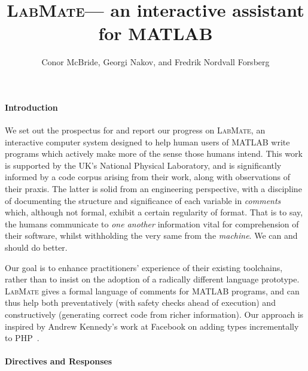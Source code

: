 \documentclass{ws-procs9x6}
\newcommand{\lr}{\textsc{LabMate}}
\newcommand{\ma}{\textsc{MATLAB}}
\newcommand{\remph}{\emph}
\begin{document}
\title{\lr --- an interactive assistant for \ma}
\author{Conor McBride, Georgi Nakov, and Fredrik Nordvall Forsberg}
\address{University of Strathclyde}

\bodymatter

\paragraph{Introduction}

We set out the prospectus for and report our progress on \lr, an interactive computer system designed to help human users of \ma{} write programs which actively make more of the sense those humans intend. This work is supported by the UK's National Physical Laboratory, and is significantly informed by a code corpus arising from their work, along with observations of their praxis. The latter is solid from an engineering perspective, with a discipline of documenting the structure and significance of each variable in \remph{comments} which, although not formal, exhibit a certain regularity of format. That is to say, the humans communicate to \remph{one another} information vital for comprehension of their software, whilst withholding the very same from the \remph{machine}. We can and should do better.


Our goal is to enhance practitioners' experience of their existing toolchains, rather than to insist on the adoption of a radically different language prototype. \lr{} gives a formal language of comments for \ma{} programs, and can thus help both preventatively (with safety checks ahead of execution) and constructively (generating correct code from richer information). Our approach is inspired by Andrew Kennedy's work at Facebook on adding types incrementally to PHP~\cite{hack}.

\paragraph{Directives and Responses}
\end{document}
